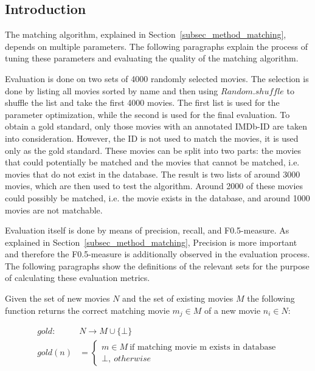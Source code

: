 \label{subsec_evaluation_matching}

\subsection{Introduction}
The matching algorithm, explained in Section~\ref{subsec_method_matching}, depends on multiple parameters.
The following paragraphs explain the process of tuning these parameters and evaluating the quality of the matching algorithm.

Evaluation is done on two sets of 4000 randomly selected movies.
The selection is done by listing all movies sorted by name and then using $Random.shuffle$ to shuffle the list and take the first 4000 movies.
The first list is used for the parameter optimization, while the second is used for the final evaluation.
To obtain a gold standard, only those movies with an annotated IMDb-ID are taken into consideration.
However, the ID is not used to match the movies, it is used only as the gold standard.
These movies can be split into two parts: the movies that could potentially be matched and the movies that cannot be matched, i.e. movies that do not exist in the database.
The result is two lists of around 3000 movies, which are then used to test the algorithm.
Around 2000 of these movies could possibly be matched, i.e. the movie exists in the database, and around 1000 movies are not matchable.

Evaluation itself is done by means of precision, recall, and F0.5-measure.
As explained in Section~\ref{subsec_method_matching}, Precision is more important and therefore the F0.5-measure is additionally observed in the evaluation process.
The following paragraphs show the definitions of the relevant sets for the purpose of calculating these evaluation metrics.

Given the set of new movies $N$ and the set of existing movies $M$ the following function returns the correct matching movie $m_{j} \in M$ of a new movie $n_{i} \in N$:

\begin{align}
	gold: ~&N \rightarrow M \cup \{\bot\} \\
	gold(n) &=
		\begin{cases}
		m \in M ~\text{if matching movie m exists in database}  \\
		\bot,~otherwise
		\end{cases}
\end{align}

